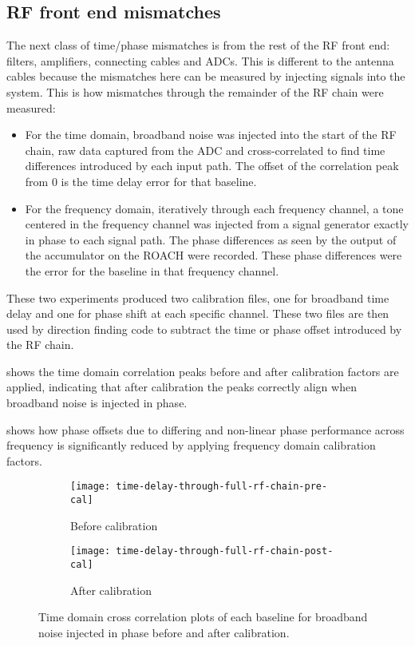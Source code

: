 \subsection{RF front end mismatches}
The next class of time/phase mismatches is from the rest of the RF front end: filters, amplifiers, connecting cables and ADCs. This is different to the antenna cables because the mismatches here can be measured by injecting signals into the system. This is how mismatches through the remainder of the RF chain were measured:
\begin{itemize}
  \item For the time domain, broadband noise was injected into the start of the RF chain, raw data captured from the ADC and cross-correlated to find time differences introduced by each input path. The offset of the correlation peak from 0 is the time delay error for that baseline.
  \item For the frequency domain, iteratively through each frequency channel, a tone centered in the frequency channel was injected from a signal generator exactly in phase to each signal path. The phase differences as seen by the output of the accumulator on the ROACH were recorded. These phase differences were the error for the baseline in that frequency channel.
\end{itemize}

These two experiments produced two calibration files, one for broadband time delay and one for phase shift at each specific channel. These two files are then used by direction finding code to subtract the time or phase offset introduced by the RF chain.

 shows the time domain correlation peaks before and after calibration factors are applied, indicating that after calibration the peaks correctly align when broadband noise is injected in phase.

 shows how phase offsets due to differing and non-linear phase performance across frequency is significantly reduced by applying frequency domain calibration factors.

\begin{figure}
  \centering
  \begin{subfigure}[b]{0.49\textwidth}
    \centering
    \texttt{[image: time-delay-through-full-rf-chain-pre-cal]}
    \caption{Before calibration}
  \end{subfigure}
  \begin{subfigure}[b]{0.49\textwidth}
    \centering
    \texttt{[image: time-delay-through-full-rf-chain-post-cal]}
    \caption{After calibration}
  \end{subfigure}
  \caption{Time domain cross correlation plots of each baseline for broadband noise injected in phase before and after calibration.}
  \label{fig:software:time-domain-cal-graphs}
\end{figure}

